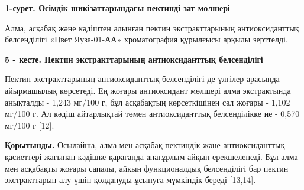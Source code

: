 {\bfseries 1-сурет. Өсімдік шикізаттарындағы пектинді зат мөлшері}

Алма, асқабақ және кәдіштен алынған пектин экстракттарының
антиоксиданттық белсенділігі «Цвет Яуза-01-АА» хроматография құрылғысы
арқылы зерттелді.

{\bfseries 5 - кесте. Пектин экстракттарының антиоксиданттық белсенділігі}


Пектин экстракттарының антиоксиданттық белсенділігі де үлгілер арасында
айырмашылық көрсетеді. Ең жоғары антиоксидант мөлшері алма экстрактында
анықталды - 1,243 мг/100 г, бұл асқабақтың көрсеткішінен сәл жоғары -
1,102 мг/100 г. Ал кәдіш айтарлықтай төмен антиоксиданттық белсенділікке
ие - 0,570 мг/100 г {[}12{]}.

{\bfseries Қорытынды.} Осылайша, алма мен асқабақ пектиндік және
антиоксиданттық қасиеттері жағынан кәдішке қарағанда анағұрлым айқын
ерекшеленеді. Бұл алма мен асқабақты жоғары сапалы, айқын функционалдық
белсенділігі бар пектин экстракттарын алу үшін қолдануды ұсынуға
мүмкіндік береді {[}13,14{]}.

